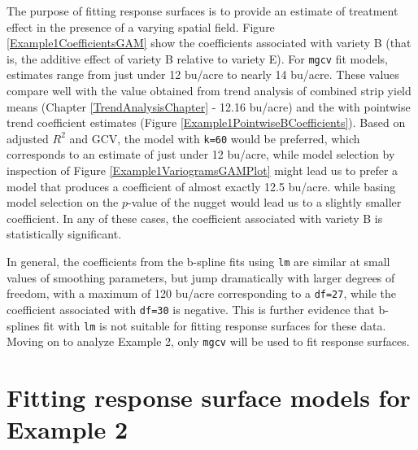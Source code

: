 \documentclass[phdcss]{SDSUThesis}
\begin{document}
The purpose of fitting response surfaces is to provide an estimate of treatment effect in the presence of a varying spatial field. Figure \ref{Example1CoefficientsGAM} show the coefficients associated with variety B (that is, the additive effect of variety B relative to variety E). 
For \texttt{mgcv} fit models, estimates range from just under 12 bu/acre to nearly 14 bu/acre.  These values compare well with the value obtained from trend analysis of combined strip yield means (Chapter \ref{TrendAnalysisChapter} - 12.16 bu/acre) and the with pointwise trend coefficient estimates (Figure \ref{Example1PointwiseBCoefficients}). Based on adjusted $R^2$ and GCV, the model with \texttt{k=60} would be preferred, which corresponds to an estimate of just under 12 bu/acre, while model selection by inspection of Figure \ref{Example1VariogramsGAMPlot} might lead us to prefer a model that produces a coefficient of almost exactly 12.5 bu/acre. while basing model selection on the $p$-value of the nugget would lead us to a slightly smaller coefficient. In any of these cases, the coefficient associated with variety B is statistically significant.

In general, the coefficients from the b-spline fits using \texttt{lm} are similar at small values of smoothing parameters, but jump dramatically with larger degrees of freedom, with a maximum of 120 bu/acre corresponding to a \texttt{df=27}, while the coefficient associated with \texttt{df=30} is negative. This is further evidence that b-splines fit with \texttt{lm} is not suitable for fitting response surfaces for these data. Moving on to analyze Example 2, only \texttt{mgcv} will be used to fit response surfaces.

\clearpage

\section{Fitting response surface models for Example 2}





\end{document}
